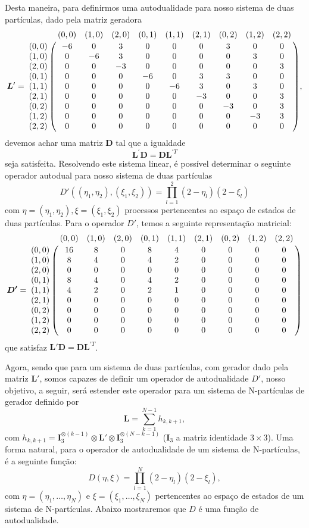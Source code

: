 \documentclass[twoside,openright,titlepage,numbers=noenddot,headinclude,  lineheaders footinclude=true,cleardoublepage=empty,
                                BCOR=5mm,paper=a4,fontsize=12pt ]{scrbook}
\theoremstyle{definition}
\begin{document}
Desta maneira, para definirmos uma autodualidade para nosso sistema de duas partículas,
dado pela matriz geradora 
\[
\bm{L}^\prime = 
\bordermatrix{~ & (0,0) & (1,0) & (2,0) & (0,1) & (1,1) & (2,1) & (0,2) & (1,2) & (2,2) \cr
   (0,0) &-6 &  0 & 3 &  0 &  0 &  0 & 3 &  0 &  0\cr 
   (1,0) &0 &  -6 & 3 &  0 &  0 &  0 &  0 & 3 &  0\cr
   (2,0) &0 &  0 &  -3 &  0 &  0 &  0 &  0 &  0 & 3\cr
   (0,1) &0 &  0 &  0 &  -6 &  0 & 3 & 3 &  0 &  0\cr
   (1,1) &0 &  0 &  0 &  0 &  -6 & 3 &  0 & 3 &  0\cr
   (2,1) &0 &  0 &  0 &  0 &  0 &  -3 &  0 &  0 & 3\cr
   (0,2) &0 &  0 &  0 &  0 &  0 &  0 &  -3 &  0 & 3\cr
   (1,2) &0 &  0 &  0 &  0 &  0 &  0 &  0 &  -3 & 3\cr
   (2,2) &0 &  0 &  0 &  0 &  0 &  0 &  0 &  0 &  0\cr },
\]
devemos achar uma matriz $\bm{D}$ tal que  a igualdade
\[\bm{L}^\prime \bm{D} = \bm{D} \bm{L}^{\prime T}\] seja satisfeita. 
Resolvendo este sistema linear, é possível determinar o seguinte operador autodual para nosso sistema de duas
partículas
\[
D'( (\eta_1, \eta_2), (\xi_1, \xi_2) ) = \prod_{l=1}^2 (2 - \eta_l) (2 - \xi_l)
\]
com $\eta = (\eta_1, \eta_2), \xi = (\xi_1, \xi_2)$ processos pertencentes ao espaço de estados de 
duas partículas. Para o operador $D'$, temos a seguinte 
representação matricial:
\[
\bm{D'} = 
\bordermatrix{~ & (0,0) & (1,0) & (2,0) & (0,1) & (1,1) & (2,1) & (0,2) & (1,2) & (2,2) \cr
   (0,0) &16 &  8 & 0 &  8 &  4 &  0 & 0 &  0 &  0\cr 
   (1,0) &8 &  4 & 0 &  4 &  2 &  0 &  0 & 0 &  0\cr
   (2,0) &0 &  0 &  0 &  0 &  0 &  0 &  0 &  0 & 0\cr
   (0,1) &8 &  4 &  0 &  4 &  2 & 0 & 0 &  0 &  0\cr
   (1,1) &4 &  2 &  0 &  2 &  1&  0 & 0 &  0 &0\cr
   (2,1) &0 &  0 &  0 &  0 &  0 &  0 &  0 &  0 & 0\cr
   (0,2) &0 &  0 &  0 &  0 &  0 &  0 &  0 &  0 & 0\cr
   (1,2) &0 &  0 &  0 &  0 &  0 &  0 &  0 &  0 & 0\cr
   (2,2) &0 &  0 &  0 &  0 &  0 &  0 &  0 &  0 &  0\cr }
\]
que satisfaz $\bm{L}'\bm{D} = \bm{D} \bm{L}^{\prime  T}$.

Agora, sendo que para um sistema de duas partículas, com gerador dado pela matriz $\bm{L}'$,
somos capazes de definir um operador de autodualidade $D'$, nosso objetivo, a seguir, será estender este operador 
para um sistema de N-partículas de  gerador definido por
\[
\bm{L} = \sum_{k=1}^{N-1} h_{k,k+1},
\]
com $h_{k,k+1} = \bm{I}_3^{\otimes(k-1)}\otimes \bm{L}' \otimes \bm{I}_3^{\otimes (N-k-1)}$ 
($\bm{I}_3$ a matriz identidade $3 \times 3$).
Uma forma natural, para o operador de autodualidade de um sistema de N-partículas, é a
seguinte função:
\[
D(\eta, \xi) = \prod_{l=1}^N (2 - \eta_l) (2- \xi_l),
\]
com $\eta = (\eta_1, \ldots, \eta_N)$ e $\xi = (\xi_1, \ldots, \xi_N)$ pertencentes ao espaço
de estados de um sistema de N-partículas. Abaixo mostraremos que $D$ é uma função de autodualidade.
\end{document}
